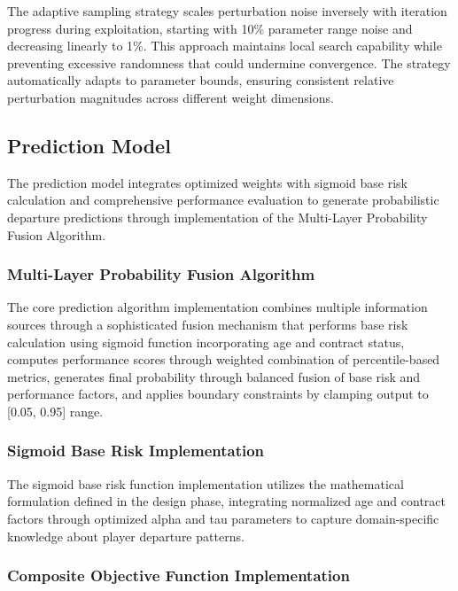 The adaptive sampling strategy scales perturbation noise inversely with iteration progress during exploitation, starting with 10\% parameter range noise and decreasing linearly to 1\%. This approach maintains local search capability while preventing excessive randomness that could undermine convergence. The strategy automatically adapts to parameter bounds, ensuring consistent relative perturbation magnitudes across different weight dimensions.

\subsection{Prediction Model}

The prediction model integrates optimized weights with sigmoid base risk calculation and comprehensive performance evaluation to generate probabilistic departure predictions through implementation of the Multi-Layer Probability Fusion Algorithm.

\subsubsection{Multi-Layer Probability Fusion Algorithm}

The core prediction algorithm implementation combines multiple information sources through a sophisticated fusion mechanism that performs base risk calculation using sigmoid function incorporating age and contract status, computes performance scores through weighted combination of percentile-based metrics, generates final probability through balanced fusion of base risk and performance factors, and applies boundary constraints by clamping output to [0.05, 0.95] range.

\subsubsection{Sigmoid Base Risk Implementation}

The sigmoid base risk function implementation utilizes the mathematical formulation defined in the design phase, integrating normalized age and contract factors through optimized alpha and tau parameters to capture domain-specific knowledge about player departure patterns.

\subsubsection{Composite Objective Function Implementation}

